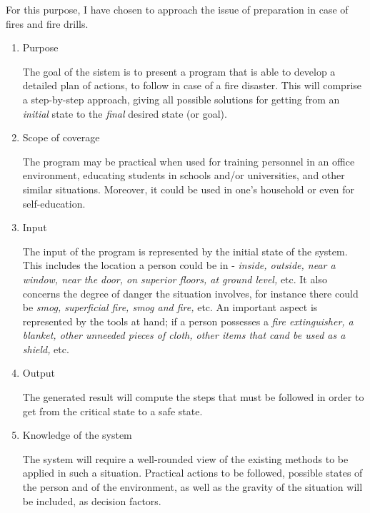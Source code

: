 \documentclass[a4paper,12pt]{report}
\begin{document}
For this purpose, I have chosen to approach the issue of preparation in case of fires and fire drills. 
\begin{enumerate}
\item Purpose

	The goal of the sistem is to present a program that is able to develop a detailed plan of actions, to follow in case of a fire disaster. This will comprise a step-by-step approach, giving all possible solutions for getting from an \textit{initial} state to the \textit{final} desired state (or goal). 

\item Scope of coverage

	The program may be practical when used for training personnel in an office environment, educating students in schools and/or universities, and other similar situations. Moreover, it could be used in one's household or even for self-education.

\item Input

	The input of the program is represented by the initial state of the system. This includes the location a person could be in - \textit{ inside, outside, near a window, near the door, on superior floors, at ground level,} etc. It also concerns the degree of danger the situation involves, for instance there could be \textit{smog, superficial fire, smog and fire,} etc. An important aspect is represented by the tools at hand; if a person possesses a \textit{fire extinguisher, a blanket, other unneeded pieces of cloth, other items that cand be used as a shield, } etc. 

\item Output

	The generated result will compute the steps that must be followed in order to get from the critical state to a safe state.
\item Knowledge of the system

	The system will require a well-rounded view of the existing methods to be applied in such a situation. Practical actions to be followed, possible states of the person and of the environment, as well as the gravity of the situation will be included, as decision factors.
\end{enumerate}
\end{document}
